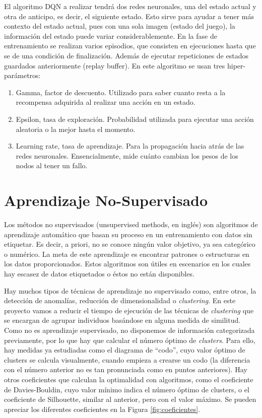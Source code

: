 		El algoritmo DQN a realizar tendrá dos redes neuronales, una del estado actual y otra de anticipo, es decir, el siguiente estado. Esto sirve para ayudar a tener más contexto del estado actual, pues con una sola imagen (estado del juego), la información del estado puede variar considerablemente. En la fase de entrenamiento se realizan varios episodios, que consisten en ejecuciones hasta que se de una condición de finalización. Además de ejecutar repeticiones de estados guardados anteriormente (replay buffer). En este algoritmo se usan tres hiper-parámetros: 
		\begin{enumerate}
			\item Gamma, factor de descuento. Utilizado para saber cuanto resta a la recompensa adquirida al realizar una acción en un estado.
			\item Epsilon, tasa de exploración. Probabilidad utilizada para ejecutar una acción aleatoria o la mejor hasta el momento.
			\item Learning rate, tasa de aprendizaje. Para la propagación hacia atrás de las redes neuronales. Ensencialmente, mide cuánto cambian los pesos de los nodos al tener un fallo.
		\end{enumerate}	
		
		
		
		
		
	

\section{Aprendizaje No-Supervisado}

	Los métodos no supervisados (unsupervised methods, en inglés) son algoritmos de aprendizaje automático que basan su proceso en un entrenamiento con datos sin etiquetar. Es decir, a priori, no se conoce ningún valor objetivo, ya sea categórico o numérico. La meta de este aprendizaje es encontrar patrones o estructuras en los datos proporcionados. Estos algoritmos son útiles en escenarios en los cuales hay escasez de datos etiquetados o éstos no están disponibles.
	
	Hay muchos tipos de técnicas de aprendizaje no supervisado como, entre otros, la detección de anomalías, reducción de dimensionalidad o \textit{clustering}. En este proyecto vamos a reducir el tiempo de ejecución de las técnicas de \textit{clustering} que se encargan de agrupar individuos basándose en alguna medida de similitud. Como no es aprendizaje supervisado, no disponemos de información categorizada previamente, por lo que hay que calcular el número óptimo de \textit{clusters}. Para ello, hay medidas ya estudiadas como el diagrama de ``codo'', cuyo valor óptimo de clusters se calcula visualmente, cuando empieza a crearse un codo (la diferencia con el número anterior no es tan pronunciada como en puntos anteriores). Hay otros coeficientes que calculan la optimalidad con algoritmos, como el coeficiente de Davies-Bouldin, cuyo valor mínimo indica el número óptimo de clusters, o el coeficiente de Silhouette, similar al anterior, pero con el valor máximo. Se pueden apreciar los diferentes coeficientes en la Figura \ref{fig:coeficientes}. 


